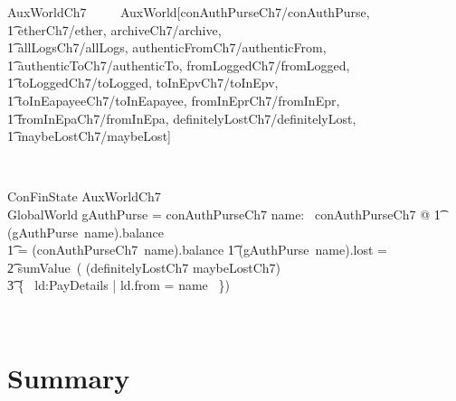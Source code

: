 \begin{LNewSDef}
\begin{zed}
    AuxWorldCh7 ~~~~ AuxWorld[conAuthPurseCh7/conAuthPurse, \\
        \t1 etherCh7/ether, archiveCh7/archive, \\
        \t1 allLogsCh7/allLogs, authenticFromCh7/authenticFrom, \\
        \t1 authenticToCh7/authenticTo, fromLoggedCh7/fromLogged, \\
        \t1 toLoggedCh7/toLogged, toInEpvCh7/toInEpv, \\
        \t1 toInEapayeeCh7/toInEapayee, fromInEprCh7/fromInEpr, \\
        \t1 fromInEpaCh7/fromInEpa, definitelyLostCh7/definitelyLost, \\
        \t1 maybeLostCh7/maybeLost]
\end{zed}~\end{LNewSDef}

\begin{LSDef}
\begin{schema}{ConFinState}
  AuxWorldCh7
  \\ %
  GlobalWorld
\where %
  \dom gAuthPurse = \dom conAuthPurseCh7
  \also %
  \forall name: \dom~conAuthPurseCh7 @
  \t1 (gAuthPurse~name).balance
  \\ %
  \t1 = (conAuthPurseCh7~name).balance
  \also %
  \t1 \land (gAuthPurse~name).lost =
  \\ %
  \t2 sumValue~( (definitelyLostCh7 \cup maybeLostCh7)
  \\ %
  \t3 \cap \{~ ld:PayDetails | ld.from = name ~\})
\end{schema}~\end{LSDef}


\newpage

\section{Summary}\label{ch7.summary}

\ldefsummary %
\lthmsummary %
\lthmaddeddefsummary %
\lthmaddedthmsummary %
\lzevessummary %
